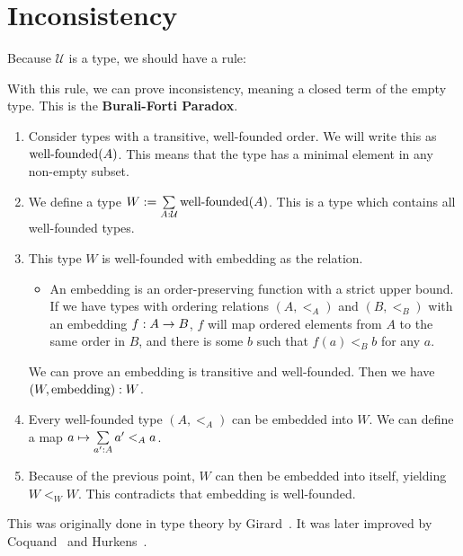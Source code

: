 \documentclass[11pt]{article}
\newcommand{\U}{\ensuremath{\mathcal{U}}}
\newcommand{\wf}[1]{\ensuremath{\textnormal{well-founded}(#1)}}
\begin{document}
\section{Inconsistency}
Because \U{} is a type, we should have a rule:
\begin{prooftree*}
  \infer0{\oftype{\Gamma}{\U}{\U}}
\end{prooftree*}
With this rule, we can prove inconsistency, meaning a closed term of
the empty type.  This is the \textbf{Burali-Forti Paradox}.
\begin{enumerate}
\item Consider types with a transitive, well-founded order.  We will
  write this as \wf{A}.  This means that the type has a minimal
  element in any non-empty subset.
\item We define a type $W := \dpairtype{A}{\U}{\wf{A}}$.  This is a
  type which contains all well-founded types.
\item This type $W$ is well-founded with embedding as the relation.
  \begin{itemize}
  \item An embedding is an order-preserving function with a strict
    upper bound.  If we have types with ordering relations $(A, <_A)$
    and $(B, <_B)$ with an embedding $\oftype{f}{A \rightarrow B}$,
    $f$ will map ordered elements from $A$ to the same order in $B$,
    and there is some $b$ such that $f(a) <_B b$ for any $a$.
  \end{itemize}
  We can prove an embedding is transitive and well-founded.  Then we
  have $\oftype{(W, \textnormal{embedding})}{W}$.
\item Every well-founded type $(A, <_A)$ can be embedded into $W$.  We
  can define a map $a \mapsto \dpairtype{a'}{A}{a' <_A a}$.
\item Because of the previous point, $W$ can then be embedded into
  itself, yielding $W <_W W$.  This contradicts that embedding is
  well-founded.
\end{enumerate}
This was originally done in type theory by
Girard~\cite{girard_paradox_girard}.  It was later improved by
Coquand~\cite{girard_paradox_coquand} and
Hurkens~\cite{girard_paradox_hurkens}.
\end{document}
